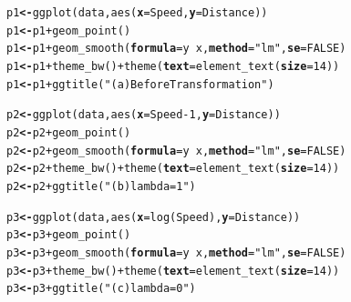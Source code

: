 \documentclass[12pt,oneside,a4paper]{article}\usepackage[]{graphicx}\usepackage[]{xcolor}
\makeatletter
\newcommand{\hlnum}[1]{\textcolor[rgb]{0,0,0}{#1}}%
\newcommand{\hlstr}[1]{\textcolor[rgb]{0,0,1}{#1}}%
\newcommand{\hlopt}[1]{\textcolor[rgb]{0,0,0}{#1}}%
\newcommand{\hlstd}[1]{\textcolor[rgb]{0,0,0}{#1}}%
\newcommand{\hlkwb}[1]{\textcolor[rgb]{0.498,0,0.333}{\textbf{#1}}}%
\newcommand{\hlkwc}[1]{\textcolor[rgb]{0.498,0,0.333}{\textbf{#1}}}%
\newcommand{\hlkwd}[1]{\textcolor[rgb]{0,0,0}{#1}}%
\newenvironment{kframe}{%
 \def\at@end@of@kframe{}%
 \ifinner\ifhmode%
  \def\at@end@of@kframe{\end{minipage}}%
  \begin{minipage}{\columnwidth}%
 \fi\fi%
 \def\FrameCommand##1{\hskip\@totalleftmargin \hskip-\fboxsep
 \colorbox{shadecolor}{##1}\hskip-\fboxsep
     \hskip-\linewidth \hskip-\@totalleftmargin \hskip\columnwidth}%
 \MakeFramed {\advance\hsize-\width
   \@totalleftmargin\z@ \linewidth\hsize
   \@setminipage}}%
 {\par\unskip\endMakeFramed%
 \at@end@of@kframe}
\newenvironment{knitrout}{}{} %
\makeatother
\begin{document}
\begin{knitrout}
\color{fgcolor}\begin{kframe}
\begin{alltt}
\hlstd{p1} \hlkwb{<-} \hlkwd{ggplot}\hlstd{(data,} \hlkwd{aes}\hlstd{(}\hlkwc{x} \hlstd{= Speed,} \hlkwc{y} \hlstd{= Distance))}
\hlstd{p1} \hlkwb{<-} \hlstd{p1} \hlopt{+} \hlkwd{geom_point}\hlstd{()}
\hlstd{p1} \hlkwb{<-} \hlstd{p1} \hlopt{+} \hlkwd{geom_smooth}\hlstd{(}\hlkwc{formula} \hlstd{= y} \hlopt{~} \hlstd{x,} \hlkwc{method} \hlstd{=} \hlstr{"lm"}\hlstd{,} \hlkwc{se} \hlstd{=} \hlnum{FALSE}\hlstd{)}
\hlstd{p1} \hlkwb{<-} \hlstd{p1} \hlopt{+} \hlkwd{theme_bw}\hlstd{()} \hlopt{+} \hlkwd{theme}\hlstd{(}\hlkwc{text} \hlstd{=} \hlkwd{element_text}\hlstd{(}\hlkwc{size} \hlstd{=} \hlnum{14}\hlstd{))}
\hlstd{p1} \hlkwb{<-} \hlstd{p1} \hlopt{+} \hlkwd{ggtitle}\hlstd{(}\hlstr{"(a) Before Transformation"}\hlstd{)}

\hlstd{p2} \hlkwb{<-} \hlkwd{ggplot}\hlstd{(data,} \hlkwd{aes}\hlstd{(}\hlkwc{x} \hlstd{= Speed} \hlopt{-} \hlnum{1}\hlstd{,} \hlkwc{y} \hlstd{= Distance))}
\hlstd{p2} \hlkwb{<-} \hlstd{p2} \hlopt{+} \hlkwd{geom_point}\hlstd{()}
\hlstd{p2} \hlkwb{<-} \hlstd{p2} \hlopt{+} \hlkwd{geom_smooth}\hlstd{(}\hlkwc{formula} \hlstd{= y} \hlopt{~} \hlstd{x,} \hlkwc{method} \hlstd{=} \hlstr{"lm"}\hlstd{,} \hlkwc{se} \hlstd{=} \hlnum{FALSE}\hlstd{)}
\hlstd{p2} \hlkwb{<-} \hlstd{p2} \hlopt{+} \hlkwd{theme_bw}\hlstd{()} \hlopt{+} \hlkwd{theme}\hlstd{(}\hlkwc{text} \hlstd{=} \hlkwd{element_text}\hlstd{(}\hlkwc{size} \hlstd{=} \hlnum{14}\hlstd{))}
\hlstd{p2} \hlkwb{<-} \hlstd{p2} \hlopt{+} \hlkwd{ggtitle}\hlstd{(}\hlstr{"(b) lambda = 1"}\hlstd{)}

\hlstd{p3} \hlkwb{<-} \hlkwd{ggplot}\hlstd{(data,} \hlkwd{aes}\hlstd{(}\hlkwc{x} \hlstd{=} \hlkwd{log}\hlstd{(Speed),} \hlkwc{y} \hlstd{= Distance))}
\hlstd{p3} \hlkwb{<-} \hlstd{p3} \hlopt{+} \hlkwd{geom_point}\hlstd{()}
\hlstd{p3} \hlkwb{<-} \hlstd{p3} \hlopt{+} \hlkwd{geom_smooth}\hlstd{(}\hlkwc{formula} \hlstd{= y} \hlopt{~} \hlstd{x,} \hlkwc{method} \hlstd{=} \hlstr{"lm"}\hlstd{,} \hlkwc{se} \hlstd{=} \hlnum{FALSE}\hlstd{)}
\hlstd{p3} \hlkwb{<-} \hlstd{p3} \hlopt{+} \hlkwd{theme_bw}\hlstd{()} \hlopt{+} \hlkwd{theme}\hlstd{(}\hlkwc{text} \hlstd{=} \hlkwd{element_text}\hlstd{(}\hlkwc{size} \hlstd{=} \hlnum{14}\hlstd{))}
\hlstd{p3} \hlkwb{<-} \hlstd{p3} \hlopt{+} \hlkwd{ggtitle}\hlstd{(}\hlstr{"(c) lambda = 0"}\hlstd{)}


\end{alltt}
\end{kframe}
\end{knitrout}
\end{document}
